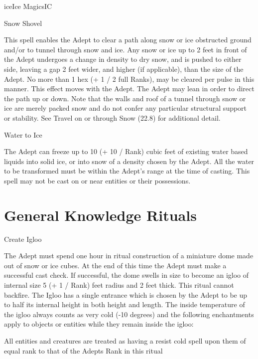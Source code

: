 \begin{College}[1.5]{ice}{Ice Magics}{IC}
\begin{spell}[G-7]{Snow Shovel}
\begin{effects}
This spell enables the Adept to clear a path along snow or ice
obstructed ground and/or to tunnel through snow and ice.  Any snow or
ice up to 2 feet in front of the Adept undergoes a change in density
to dry snow, and is pushed to either side, leaving a gap 2 feet wider,
and higher (if applicable), than the size of the Adept.  No more than
1 hex (+ 1 / 2 full Ranks), may be cleared per pulse in this manner.
This effect moves with the Adept.  The Adept may lean in order to
direct the path up or down.  Note that the walls and roof of a tunnel
through snow or ice are merely packed snow and do not confer any
particular structural support or stability. See Travel on or through
Snow (22.8) for additional detail.
\end{effects}
\end{spell}

\begin{spell}[G-8]{Water to Ice}
\begin{effects}
The Adept can freeze up to 10 (+ 10 / Rank) cubic feet of existing
water based liquids into solid ice, or into snow of a density chosen
by the Adept. All the water to be transformed must be within the
Adept’s range at the time of casting.  This spell may not be cast on
or near entities or their possessions.
\end{effects}
\end{spell}

\section{General Knowledge Rituals}

\begin{ritual}[Q-1]{Create Igloo}
\begin{effects}
The Adept must spend one hour in ritual construction of a miniature
dome made out of snow or ice cubes. At the end of this time the Adept
must make a successful cast check.  If successful, the dome swells in
size to become an igloo of internal size 5 (+ 1 / Rank) feet radius
and 2 feet thick. This ritual cannot backfire.  The Igloo has a single
entrance which is chosen by the Adept to be up to half its internal
height in both height and length.  The inside temperature of the igloo
always counts as very cold (-10 degrees) and the following
enchantments apply to objects or entities while they remain inside the
igloo:
\begin{Itemize}
\item All entities and creatures are treated as having a resist cold
  spell upon them of equal rank to that of the Adepts Rank in this
  ritual


\end{Itemize}
\end{effects}
\end{ritual}
\end{College}
